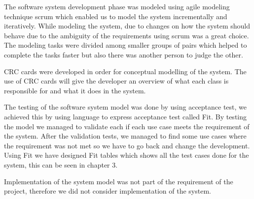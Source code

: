 The software system development phase was modeled using agile modeling technique scrum which enabled us to model the system incrementally and iteratively. While modeling the system, due to changes on how the system should behave due to the ambiguity of the requirements using scrum was a great choice.  The modeling tasks were divided among smaller groups of pairs which helped to complete the tasks faster but also there was another person to judge the other. 

CRC cards were developed in order for conceptual modelling of the system.  The use of CRC cards will give the developer an overview of what each class is responsible for and what it does in the system. 

The testing of the software system model was done by using acceptance test, we achieved this by using language to express acceptance test called Fit. By testing the model we managed to validate each if each use case meets the requirement of the system. After the validation tests, we managed to find some use cases where the requirement was not met so we have to go back and change the development.  Using Fit we have designed Fit tables which shows all the test cases done for the system, this can be seen in chapter 3.

Implementation of the system model was not part of the requirement of the project, therefore we did not consider implementation of the system.

